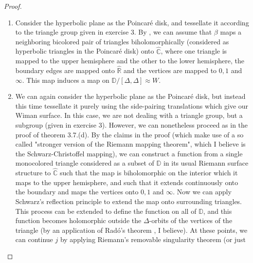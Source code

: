 \documentclass[reqno]{amsart}
\theoremstyle{definition}
\theoremstyle{remark}
\begin{document}
\begin{proof}
        \begin{enumerate}
            \item Consider
        the hyperbolic plane as the Poincaré disk, and tessellate it
        according to the triangle group
        given in exercise 3.
        By \cite[Thm 3.7.(d)]{JW}, we can assume that $\beta$ maps
        a neighboring bicolored pair of triangles biholomorphically (considered
        as hyperbolic triangles in the Poincaré disk) onto
        $\hat{\mathbb{C}}$, where one triangle is mapped to the upper hemisphere
        and the other to the lower hemisphere, the boundary edges are mapped
        onto $\hat{\mathbb{R}}$ and the vertices are mapped to $0,1$ and $\infty$. This map induces
        a map on $\mathbb{D}/
        \left[\Delta, \Delta \right] 
        \approx W$.
        \item 
        We can again consider the
        hyperbolic plane as the Poincaré
        disk, but instead this time tessellate it purely using the
        side-pairing translations
        which give our Wiman surface.
        In this case, we are not dealing with a triangle group, but a subgroup (given in exercise 3). However, we can
        nonetheless proceed as in the
        proof of theorem 3.7.(d). 
        By the claims in the proof (which make use of a so called "stronger version of the Riemann mapping theorem", which I believe is the Schwarz-Christoffel mapping), we 
        can construct a function from
        a single monocolored triangle
        considered as a subset of $\mathbb{D}$ in its usual Riemann surface structure
        to $\hat{\mathbb{C}}$ such that
        the map is biholomorphic on the
        interior which it maps to
        the upper hemisphere, and such that it extends continuously onto
        the boundary and maps
        the vertices onto $0, 1$ and $\infty$. Now we can apply Schwarz's reflection principle to
        extend the map onto surrounding triangles. This process can be extended to define the function
        on all of $\mathbb{D}$, and this function becomes holomorphic outside the $\Delta$-orbits of
        the vertices of the triangle (by an application of Radó's theorem \cite{Radó}, I believe). At
        these points, we can continue
        $j$ by applying Riemann's removable singularity theorem (or just 
        \end{enumerate}
        

    


\end{proof}
\end{document}
